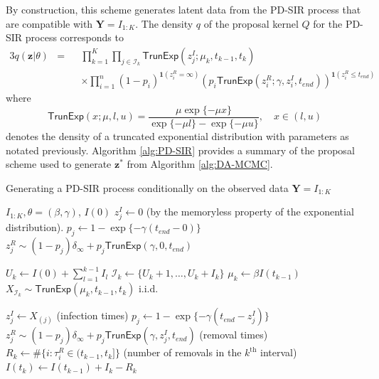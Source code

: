 \documentclass[12pt]{article}
\begin{document}
	By construction, this scheme generates latent data from the PD-SIR process that are compatible with $\mathbf{Y} = I_{1:K}$. The density $q$ of the proposal kernel $Q$ for the PD-SIR process corresponds to
	\begin{alignat}{3}
		\label{eq:q}
		q(\mathbf{z}|\theta) 
		& = && \prod_{k=1}^K \prod_{j\in\mathcal{I}_k} \textsf{TrunExp}(z^I_j; \mu_{k}, t_{k-1}, t_{k}) \\
		& && \times \prod_{i=1}^{n} \left( 1 - p_i \right)^{\mathbf{1}(z^R_i = \infty)} \left( p_i \textsf{TrunExp}(z^R_i; \gamma, z^I_i, t_{end}) \right)^{\mathbf{1}(z^R_i \le t_{end})}  \nonumber
	\end{alignat}
	where %
	$$\textsf{TrunExp}(x; \mu, l, u) = \dfrac{\mu \exp\{-\mu x\}}{\exp\{-\mu l\} - \exp\{-\mu u\}}, \quad x \in (l, u)$$
	denotes the density of a truncated exponential distribution with parameters as notated previously. Algorithm \ref{alg:PD-SIR} provides a summary of the proposal scheme used to generate $\mathbf{z^\ast}$ from Algorithm \ref{alg:DA-MCMC}.
	
	\begin{algorithm}
		\caption{Generating a PD-SIR process conditionally on the observed data $\mathbf{Y} = I_{1:K}$}
		\label{alg:PD-SIR}
		\begin{algorithmic}
			\REQUIRE $I_{1:K}, \theta = (\beta, \gamma)$, $I(0)$
			\STATE $z^I_j \leftarrow 0$ (by the memoryless property of the exponential distribution).
			\STATE $p_j \leftarrow 1 - \exp\{-\gamma (t_{end} - 0)\}$
			\STATE $z^R_j \sim (1 - p_j) \delta_\infty + p_j \textsf{TrunExp}(\gamma, 0, t_{end})$
			\ENDFOR
			
			\STATE $U_k \leftarrow I(0) + \sum_{l=1}^{k-1} I_l$
			\STATE $\mathcal{I}_k \leftarrow \{U_k + 1, \dots, U_k + I_k\}$
			\STATE $\mu_k \leftarrow \beta I(t_{k-1})$
			\STATE $X_{\mathcal{I}_k} \sim \textsf{TrunExp}(\mu_k, t_{k-1}, t_k)$ i.i.d.\
			
			\STATE $z^I_j \leftarrow X_{(j)}$ (infection times)
			\STATE $p_j \leftarrow 1 - \exp\{-\gamma(t_{end} - z^I_j)\}$
			\STATE $z^R_j \sim (1 - p_j) \delta_\infty + p_j \textsf{TrunExp}(\gamma, z^I_j, t_{end})$ (removal times)
			\ENDFOR
			\STATE $R_k \leftarrow \#\{i:\tau^R_i \in (t_{k-1}, t_k]\}$ (number of removals in the $k^{\text{th}}$ interval)
			\STATE $I(t_k) \leftarrow I(t_{k-1}) + I_k - R_k$
			\ENDFOR
		\end{algorithmic}
	\end{algorithm}
	
\end{document}
